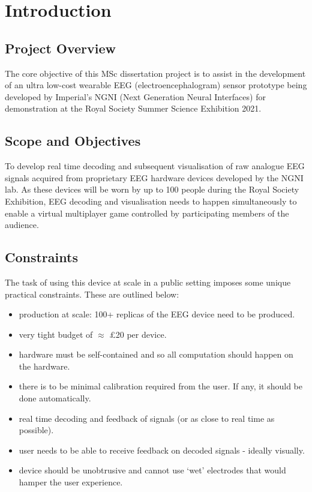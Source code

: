 \chapter{Introduction}

\graphicspath{ {report/Chapter1/assets/} } 

\section{Project Overview}

The core objective of this MSc dissertation project is to assist in the development of an ultra low-cost wearable EEG (electroencephalogram) sensor prototype being developed by Imperial's NGNI (Next Generation Neural Interfaces) for demonstration at the Royal Society Summer Science Exhibition 2021. 

\section{Scope and Objectives}
To develop real time decoding and subsequent visualisation of raw analogue EEG signals acquired from proprietary EEG hardware devices developed by the NGNI lab. As these devices will be worn by up to 100 people during the Royal Society Exhibition, EEG decoding and visualisation needs to happen simultaneously to enable a virtual multiplayer game controlled by participating members of the audience.

\section{Constraints}
The task of using this device at scale in a public setting imposes some unique practical constraints. These are outlined below:
\begin{itemize}
    \item production at scale: 100+ replicas of the EEG device need to be produced.
    \item very tight budget of $\approx$ £20 per device.
    \item hardware must be self-contained and so all computation should happen on the hardware. 
    \item there is to be minimal calibration required from the user. If any, it should be done automatically.
    \item real time decoding and feedback of signals (or as close to real time as possible).
    \item user needs to be able to receive feedback on decoded signals - ideally visually.
    \item device should be unobtrusive and cannot use `wet' electrodes that would hamper the user experience.
\end{itemize}


